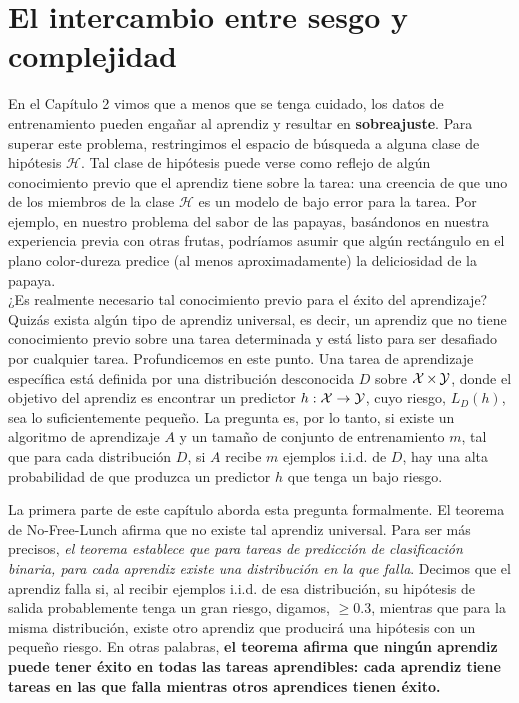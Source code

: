 \chapter{El intercambio entre sesgo y complejidad}
En el Capítulo 2 vimos que a menos que se tenga cuidado, los datos de entrenamiento pueden engañar al aprendiz y resultar en \textbf{sobreajuste}. Para superar este problema, restringimos el espacio de búsqueda a alguna clase de hipótesis $\mathcal{H}$. Tal clase de hipótesis puede verse como reflejo de algún conocimiento previo que el aprendiz tiene sobre la tarea: una creencia de que uno de los miembros de la clase $\mathcal{H}$ es un modelo de bajo error para la tarea. Por ejemplo, en nuestro problema del sabor de las papayas, basándonos en nuestra experiencia previa con otras frutas, podríamos asumir que algún rectángulo en el plano color-dureza predice (al menos aproximadamente) la deliciosidad de la papaya.\\

¿Es realmente necesario tal conocimiento previo para el éxito del aprendizaje? Quizás exista algún tipo de aprendiz universal, es decir, un aprendiz que no tiene conocimiento previo sobre una tarea determinada y está listo para ser desafiado por cualquier tarea. Profundicemos en este punto. Una tarea de aprendizaje específica está definida por una distribución desconocida $D$ sobre $\mathop{\mbox{$\mathcal{X}$}}\nolimits \times \mathop{\mbox{$\mathcal{Y}$}}\nolimits$, donde el objetivo del aprendiz es encontrar un predictor $h: \mathop{\mbox{$\mathcal{X}$}}\nolimits \rightarrow \mathop{\mbox{$\mathcal{Y}$}}\nolimits$, cuyo riesgo, $L_D(h)$, sea lo suficientemente pequeño. La pregunta es, por lo tanto, si existe un algoritmo de aprendizaje $A$ y un tamaño de conjunto de entrenamiento $m$, tal que para cada distribución $D$, si $A$ recibe $m$ ejemplos i.i.d. de $D$, hay una alta probabilidad de que produzca un predictor $h$ que tenga un bajo riesgo.

La primera parte de este capítulo aborda esta pregunta formalmente. El teorema de No-Free-Lunch afirma que no existe tal aprendiz universal. Para ser más precisos, \textit{el teorema establece que para tareas de predicción de clasificación binaria, para cada aprendiz existe una distribución en la que falla}. Decimos que el aprendiz falla si, al recibir ejemplos i.i.d. de esa distribución, su hipótesis de salida probablemente tenga un gran riesgo, digamos, $\geq 0.3$, mientras que para la misma distribución, existe otro aprendiz que producirá una hipótesis con un pequeño riesgo. En otras palabras, \textbf{el teorema afirma que ningún aprendiz puede tener éxito en todas las tareas aprendibles: cada aprendiz tiene tareas en las que falla mientras otros aprendices tienen éxito.}

